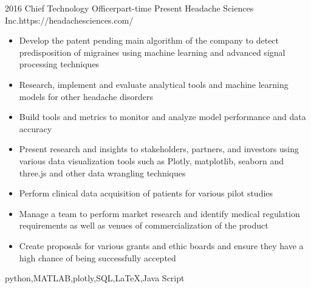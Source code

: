 \begin{experiences}
	\myExperience
	{2016}       {Chief Technology Officer}{part-time}
	{Present}      {Headache Sciences Inc.}{https://headachesciences.com/}
	{
		\begin{itemize}
			\item Develop the patent pending main algorithm of the company to detect predisposition of migraines using machine learning and advanced signal processing techniques
			\item Research, implement and evaluate analytical tools and machine learning models for other headache disorders
			\item Build tools and metrics to monitor and analyze model performance and data accuracy
			\item Present research and insights to stakeholders, partners, and investors using various data visualization tools such as Plotly, matplotlib, seaborn and three.js and other data wrangling techniques
			\item Perform clinical data acquisition of patients for various pilot studies
			\item Manage a team to perform market research and identify medical regulation requirements as well as venues of commercialization of the product
			\item Create proposals for various grants and ethic boards and ensure they have a high chance of being successfully accepted
		\end{itemize}
	}
	{python,MATLAB,plotly,SQL,\LaTeX,Java Script}
	
\end{experiences}
